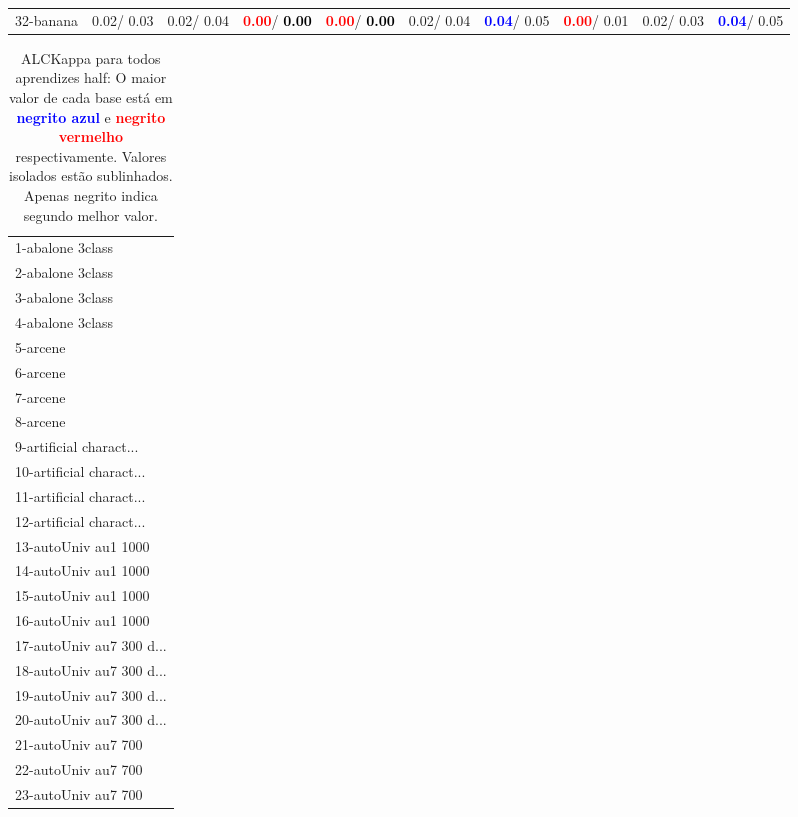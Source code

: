 \begin{table}[h]
\begin{center}
{\begin{tabular}{lc|c|c|c|c|c|c|c|c}
32-banana &   0.02/  0.03 &   0.02/  0.04 & \textcolor{red}{\textbf{  0.00}}/\textcolor{black}{\textbf{  0.00}} & \textcolor{red}{\textbf{  0.00}}/\textcolor{black}{\textbf{  0.00}} &   0.02/  0.04 & \textcolor{blue}{\textbf{  0.04}}/  0.05 & \textcolor{red}{\textbf{  0.00}}/  0.01 &   0.02/  0.03 & \textcolor{blue}{\textbf{  0.04}}/  0.05 \\\end{tabular}}\label{stratsALCKappa0AllRedux50a}
\end{center}
\end{table}
\begin{table}[h]
\caption{ALCKappa para todos aprendizes half: O maior valor de cada base está em \textcolor{blue}{\textbf{negrito azul}} e \textcolor{red}{\textbf{negrito vermelho}} respectivamente. Valores isolados estão sublinhados. Apenas negrito indica segundo melhor valor.}
\begin{center}\begin{tabular}{l}
 & \\ \hline 1-abalone 3class &  \\
2-abalone 3class &  \\
3-abalone 3class &  \\
4-abalone 3class &  \\
5-arcene &  \\
6-arcene &  \\
7-arcene &  \\ \hline
8-arcene &  \\
9-artificial charact... &  \\
10-artificial charact... &  \\
11-artificial charact... &  \\
12-artificial charact... &  \\
13-autoUniv au1 1000 &  \\
14-autoUniv au1 1000 &  \\ \hline
15-autoUniv au1 1000 &  \\
16-autoUniv au1 1000 &  \\
17-autoUniv au7 300 d... &  \\
18-autoUniv au7 300 d... &  \\
19-autoUniv au7 300 d... &  \\
20-autoUniv au7 300 d... &  \\
21-autoUniv au7 700 &  \\ \hline
22-autoUniv au7 700 &  \\
23-autoUniv au7 700 &  \\

\end{tabular}
\end{center}
\end{table}
